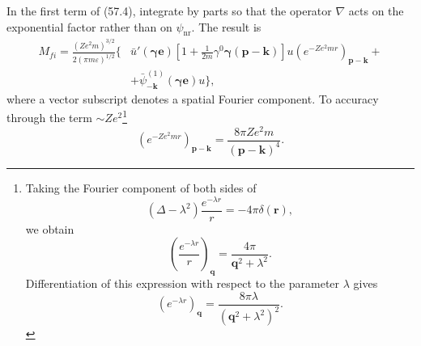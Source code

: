 In the first term of (57.4), integrate by parts so that the operator $\nabla$ acts on the exponential factor rather than on $\psi_{\text{nr}}$. The result is
\begin{equation}
\begin{aligned}
M_{fi}
=\frac{(Ze^2m)^{3/2}}{2(\pi m\varepsilon)^{1/2}}
\Biggl\{&
\bar u'(\boldsymbol\gamma\mathbf e)
\left[1+\frac1{2m}\gamma^0\boldsymbol\gamma
(\mathbf p-\mathbf k)\right]u
\left(e^{-Ze^2mr}\right)_{\mathbf p-\mathbf k}+{}\\
&+\bar\psi_{-\mathbf k}^{(1)}
(\boldsymbol\gamma\mathbf e)u\Biggr\},
\end{aligned}
\tag{57.5}
\end{equation}
where a vector subscript denotes a spatial Fourier component. To accuracy through the term $\sim Ze^2$\footnote{Taking the Fourier component of both sides of
\[
(\Delta-\lambda^2)\frac{e^{-\lambda r}}r=-4\pi\delta(\mathbf r),
\]
we obtain
\begin{equation}
\left(\frac{e^{-\lambda r}}r\right)_{\mathbf q}
=\frac{4\pi}{\mathbf q^2+\lambda^2}.
\tag{57.6a}
\end{equation}
Differentiation of this expression with respect to the parameter $\lambda$ gives
\begin{equation}
\left(e^{-\lambda r}\right)_{\mathbf q}
=\frac{8\pi\lambda}{(\mathbf q^2+\lambda^2)^2}.
\tag{57.6b}
\end{equation}}
\begin{equation}
\left(e^{-Ze^2mr}\right)_{\mathbf p-\mathbf k}
=\frac{8\pi Ze^2m}{(\mathbf p-\mathbf k)^4}.
\tag{57.6}
\end{equation}

